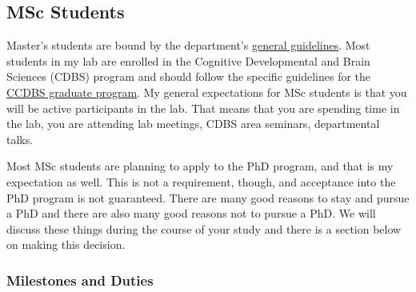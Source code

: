 \documentclass{article}
\begin{document}
\subsection {MSc Students}
Master's students are bound by the department's \href{http://psychology.uwo.ca/graduate/index.html}{general guidelines}. Most students in my lab are enrolled in the Cognitive Developmental and Brain Sciences (CDBS) program and should follow the specific guidelines for the \href{http://psychology.uwo.ca/graduate/program_information/cdbs_program_requirements.html}{CCDBS graduate program}. My general expectations for MSc students is that you will be active participants in the lab. That means that you are spending time in the lab, you are attending lab meetings, CDBS area seminars, departmental talks. 

Most MSc students are planning to apply to the PhD program, and that is my expectation as well. This is not a requirement, though, and acceptance into the PhD program is not guaranteed. There are many good reasons to stay and pursue a PhD and there are also many good reasons not to pursue a PhD. We will discuss these things during the course of your study and there is a section below on making this decision.

\subsubsection{Milestones and Duties}
\end{document}
